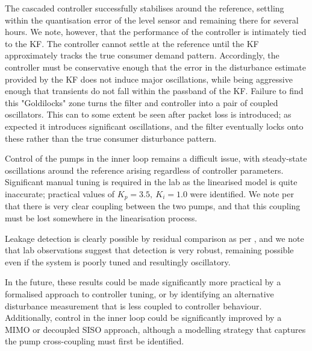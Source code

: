 The cascaded controller successfully stabilises around the reference, settling within the quantisation error of the level sensor and remaining there for several hours. We note, however, that the performance of the controller is intimately tied to the KF. The controller cannot settle at the reference until the KF approximately tracks the true consumer demand pattern. Accordingly, the controller must be conservative enough that the error in the disturbance estimate provided by the KF does not induce major oscillations, while being aggressive enough that transients do not fall within the passband of the KF. Failure to find this "Goldilocks" zone turns the filter and controller into a pair of coupled oscillators. This can to some extent be seen after packet loss is introduced; as expected it introduces significant oscillations, and the filter eventually locks onto these rather than the true consumer disturbance pattern.

Control of the pumps in the inner loop remains a difficult issue, with steady-state oscillations around the reference arising regardless of controller parameters. Significant manual tuning is required in the lab as the linearised model is quite inaccurate; practical values of $K_p = 3.5, \ K_i = 1.0$ were identified. We note per  that there is very clear coupling between the two pumps, and that this coupling must be lost somewhere in the linearisation process. 

Leakage detection is clearly possible by residual comparison as per , and we note that lab observations suggest that detection is very robust, remaining possible even if the system is poorly tuned and resultingly oscillatory.

In the future, these results could be made significantly more practical by a formalised approach to controller tuning, or by identifying an alternative disturbance measurement that is less coupled to controller behaviour. Additionally, control in the inner loop could be significantly improved by a MIMO or decoupled SISO approach, although a modelling strategy that captures the pump cross-coupling must first be identified.